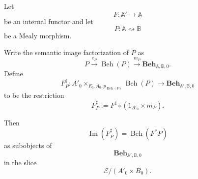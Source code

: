 \begin{lemma}
\label{lem:input-pullback-semantic-images}
    Let
    \[
        F:\mathbb A'\to\mathbb A
    \]
    be an internal functor and let
    \[
        P:\mathbb A\rightsquigarrow\mathbb B
    \]
    be a Mealy morphism.

    Write the semantic image factorization of \(P\) as
    \[
        P
        \xrightarrow{e_P}
        \operatorname{Beh}(P)
        \xrightarrow{m_P}
        \mathbf{Beh}_{\mathbb A,\mathbb B,0}.
    \]
    Define
    \[
        F^\sharp_P:
        A'_0
        \times_{F_0,A_0,p_{\operatorname{Beh}(P)}}
        \operatorname{Beh}(P)
        \to
        \mathbf{Beh}_{\mathbb A',\mathbb B,0}
    \]
    to be the restriction
    \[
        F^\sharp_P
        :=
        F^\sharp
        \circ
        (1_{A'_0}\times m_P).
    \]

    Then
    \[
        \operatorname{Im}(F^\sharp_P)
        =
        \operatorname{Beh}(F^*P)
    \]
    as subobjects of
    \[
        \mathbf{Beh}_{\mathbb A',\mathbb B,0}
    \]
    in the slice
    \[
        \mathcal E/(A'_0\times B_0).
    \]
\end{lemma}

